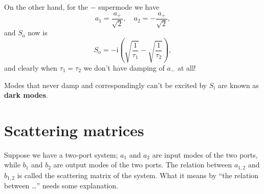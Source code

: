 \documentclass[hyperref, a4paper]{article}
\newcommand*{\ii}{\mathrm{i}}
\newcommand*{\concept}[1]{{\textbf{#1}}}
\newcommand*{\Si}{S_{\text{i}}}
\newcommand*{\So}{S_{\text{o}}}
\begin{document}
On the other hand, for the $-$ supermode we have 
\begin{equation}
    a_1 = \frac{a_+}{\sqrt{2}}, \quad a_2 = - \frac{a_+}{\sqrt{2}},
\end{equation}
and $\So$ now is 
\begin{equation}
    \So = - \ii \left( \sqrt{\frac{1}{\tau_1}} - \sqrt{\frac{1}{\tau_2}} \right),
\end{equation}
and clearly when $\tau_1 = \tau_2$ we don't have damping of $a_-$ at all!

Modes that never damp and correspondingly can't be excited by $\Si$ 
are known as \concept{dark modes}.

\section{Scattering matrices}

Suppose we have a two-port system; 
$a_1$ and $a_2$ are input modes of the two ports, 
while $b_1$ and $b_2$ are output modes of the two ports.
The relation between $a_{1,2}$ and $b_{1,2}$ is called the scattering matrix of the system.
What it means by ``the relation between \dots'' needs some explanation.
\end{document}
